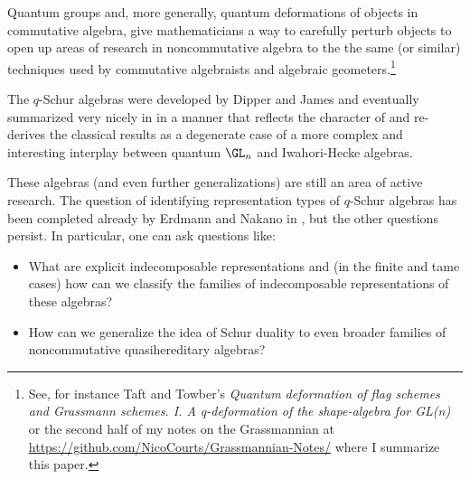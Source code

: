 \documentclass[12pt]{article}
\begin{document}
	Quantum groups and, more generally, quantum deformations of objects in commutative algebra, give mathematicians 
	a way to carefully perturb objects to open up areas of research in noncommutative algebra to the the same (or similar) techniques 
	used by commutative algebraists and algebraic geometers.\footnote{See, for instance Taft and Towber's \textit{Quantum deformation of flag schemes and Grassmann schemes. I. A q-deformation of the shape-algebra for GL(n)}
	or the second half of my notes on the Grassmannian at \href{https://github.com/NicoCourts/Grassmannian-Notes/}{https://github.com/NicoCourts/Grassmannian-Notes/} where I summarize this paper.} 

	The $q$-Schur algebras were developed by Dipper and James and eventually summarized very nicely in \cite{donkin-q-schur} in a manner that
	reflects the character of \cite{green} and re-derives the classical results as a degenerate case of a more complex and 
	interesting interplay between quantum $\GL_n$ and Iwahori-Hecke algebras.

	These algebras (and even further generalizations) are still an area of active research. The question of identifying representation 
	types of $q$-Schur algebras has been completed already by Erdmann and Nakano in \cite{erdmann-nakano}, 
	but the other questions persist. In particular, one can ask questions like:
	\begin{itemize}
		\item What are explicit indecomposable representations and (in the finite and tame cases) how can we classify the families of indecomposable representations of these algebras?
		\item How can we generalize the idea of Schur duality to even broader families of noncommutative quasihereditary algebras?
	\end{itemize}


\newpage

\printbibliography
{}
\end{document}

